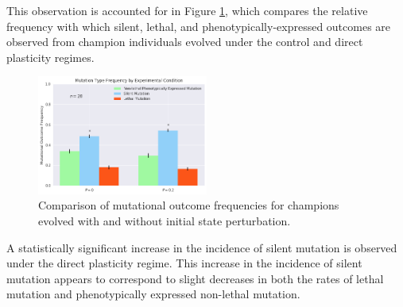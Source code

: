 This observation is accounted for in Figure \ref{fig:mutation_type_direct}, which compares the relative frequency with which silent, lethal, and phenotypically-expressed outcomes are observed from champion individuals evolved under the control and direct plasticity regimes.
\begin{figure}
    \centering
    \includegraphics[width=0.5\textwidth]{img/mutation_type_direct}
  	\caption{Comparison of mutational outcome frequencies for champions evolved with and without initial state perturbation.}
    \label{fig:mutation_type_direct}
\end{figure}
A statistically significant increase in the incidence of silent mutation is observed under the direct plasticity regime.
This increase in the incidence of silent mutation appears to correspond to slight decreases in both the rates of lethal mutation and phenotypically expressed non-lethal mutation.


